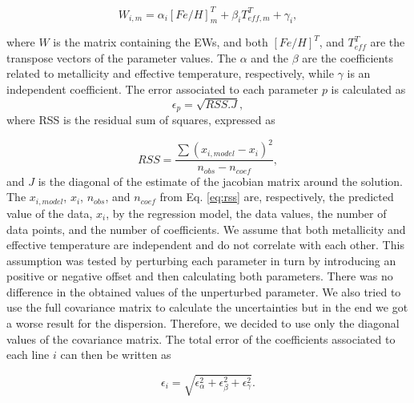 \documentclass{aa}
\begin{document}
\begin{equation}
W_{i,m} = \alpha_{i}[Fe/H]_{m}^{T} + \beta_{i}T_{eff,m}^{T} + \gamma_{i}, %
\label{eq:fit}
\end{equation}

where $W$ is the matrix containing the EWs, and both $[Fe/H]^{T}$, and $T_{eff}^{T}$ are the transpose vectors of the parameter values. The $\alpha$ and the $\beta$ are the coefficients related to metallicity and effective temperature, respectively, while $\gamma$ is an independent coefficient. The error associated to each parameter $p$ is calculated as 
\begin{equation}
\label{eq:rss}
\epsilon_{p} = \sqrt{RSS.J},
\end{equation}
where RSS is the residual sum of squares, expressed as

\begin{equation}
RSS = \frac{\sum{(x_{i,model}-x_{i})^{2}}}{n_{obs}-n_{coef}},
\end{equation}
and $J$ is the diagonal of the estimate of the jacobian matrix around the solution. %
The $x_{i,model}$, $x_{i}$, $n_{obs}$, and $n_{coef}$ from Eq. \ref{eq:rss} are, respectively, the predicted value of the data, $x_{i}$, by the regression model, the data values, the number of data points, and the number of coefficients. We assume that both metallicity and effective temperature are independent and do not correlate with each other. This assumption was tested by perturbing each parameter in turn by introducing an positive or negative offset and then calculating both parameters. There was no difference in the obtained values of the unperturbed parameter. We also tried to use the full covariance matrix to calculate the uncertainties but in the end we got a worse result for the dispersion. Therefore, we decided to use only the diagonal values of the covariance matrix. The total error of the coefficients associated to each line $i$ can then be written as

\begin{equation} 
\epsilon_{i} = \sqrt{\epsilon_{\alpha}^{2}+\epsilon_{\beta}^{2}+\epsilon_{\gamma}^{2}}.
\end{equation}
\end{document}
